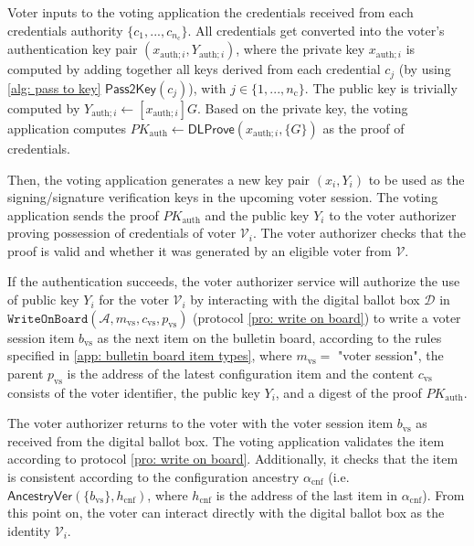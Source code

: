 Voter inputs to the voting application the credentials received from each credentials authority $\{ c_1, ..., c_{n_\mathrm{c}} \}$. All credentials get converted into the voter's authentication key pair $(x_{\mathrm{auth}; i}, Y_{\mathrm{auth}; i})$, where the private key $x_{\mathrm{auth}; i}$ is computed by adding together all keys derived from each credential $c_j$ (by using \cref{alg: pass to key} $\mathsf{Pass2Key}(c_j)$), with $j \in \{ 1, ..., n_\mathrm{c} \}$. The public key is trivially computed by $Y_{\mathrm{auth}; i} \gets [x_{\mathrm{auth}; i}]G$. Based on the private key, the voting application computes $PK_\mathrm{auth} \gets \mathsf{DLProve} (x_{\mathrm{auth}; i}, \{ G \})$ as the proof of credentials.

Then, the voting application generates a new key pair $(x_i, Y_i)$ to be used as the signing/signature verification keys in the upcoming voter session. The voting application sends the proof $PK_\mathrm{auth}$ and the public key $Y_i$ to the voter authorizer proving possession of credentials of voter $\mathcal{V}_i$. The voter authorizer checks that the proof is valid and whether it was generated by an eligible voter from $\boldsymbol{\mathcal{V}}$.

If the authentication succeeds, the voter authorizer service will authorize the use of public key $Y_i$ for the voter $\mathcal{V}_i$ by interacting with the digital ballot box $\mathcal{D}$ in $\mathtt{WriteOnBoard}(\mathcal{A}, m_\mathrm{vs}, c_\mathrm{vs}, p_\mathrm{vs})$ (protocol \ref{pro: write on board}) to write a voter session item $b_\mathrm{vs}$ as the next item on the bulletin board, according to the rules specified in \cref{app: bulletin board item types}, where $m_\mathrm{vs} =$ "voter session", the parent $p_\mathrm{vs}$ is the address of the latest configuration item and the content $c_\mathrm{vs}$ consists of the voter identifier, the public key $Y_i$, and a digest of the proof $PK_\mathrm{auth}$.

The voter authorizer returns to the voter with the voter session item $b_\mathrm{vs}$ as received from the digital ballot box. The voting application validates the item according to protocol \ref{pro: write on board}. Additionally, it checks that the item is consistent according to the configuration ancestry $\alpha_\mathrm{cnf}$ (i.e. $\mathsf{AncestryVer}(\{ b_\mathrm{vs} \}, h_\mathrm{cnf})$, where $h_\mathrm{cnf}$ is the address of the last item in $\alpha_\mathrm{cnf}$). From this point on, the voter can interact directly with the digital ballot box as the identity $\mathcal{V}_i$.


